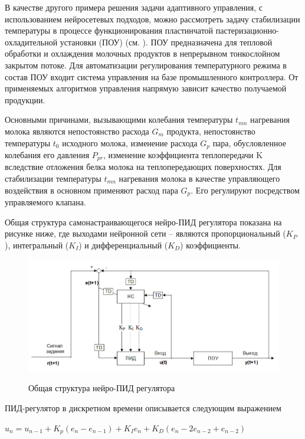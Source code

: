 В качестве другого примера решения задачи адаптивного управления, с использованием нейросетевых подходов, можно рассмотреть задачу стабилизации температуры в процессе функционирования пластинчатой пастеризационно-охладительной установки (ПОУ) (см. ). ПОУ предназначена  для  тепловой  обработки  и  охлаждения  молочных продуктов  в  непрерывном  тонкослойном  закрытом  потоке. Для  автоматизации  регулирования  температурного  режима  в  состав  ПОУ входит  система  управления  на  базе  промышленного  контроллера. От  применяемых  алгоритмов  управления  напрямую  зависит  качество получаемой продукции.

Основными  причинами,  вызывающими  колебания  температуры $t_{mn}$ нагревания молока являются непостоянство расхода $G_m$ продукта, непостоянство температуры $t_0$ исходного молока, изменение расхода $G_p$  пара,  обусловленное  колебания  его  давления $P_{pr}$, изменение коэффициента теплопередачи K вследствие отложения белка молока на теплопередающих поверхностях. Для стабилизации температуры $t_{mn}$ нагревания молока в качестве управляющего воздействия в основном применяют расход пара $G_p$. Его регулируют посредством управляемого клапана.

Общая структура самонастраивающегося  нейро-ПИД  регулятора  показана  на  рисунке ниже, где выходами нейронной сети – являются пропорциональный ($K_P$), интегральный ($K_I$) и дифференциальный ($K_D$) коэффициенты.

\begin{figure}[H]
	\caption{Общая структура  нейро-ПИД  регулятора}
	\includegraphics[scale=0.5]{images/part7/chapter_enterprise/neuropid.png}
	\label{fig:neuropid}
\end{figure}


ПИД-регулятор в дискретном времени описывается следующим выражением

$u_n = u_{n-1} + K_p (e_n - e_{n-1}) + K_I e_n + K_D (e_n - 2e_{n-2}+ e_{n-2} )$

